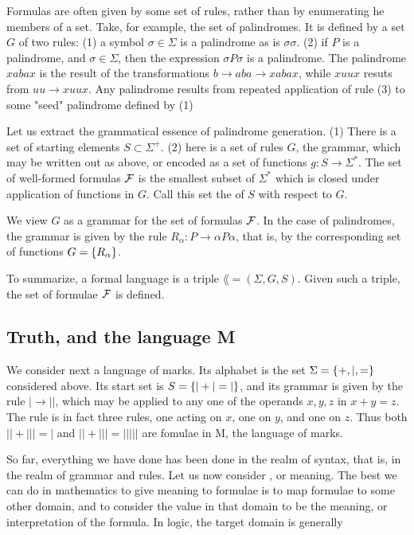 Formulas  are often given by some set of rules, rather than by enumerating he members of a set.  Take, for example, the set of palindromes.  It is defined by a set $G$ of two rules: (1) a symbol $\sigma \in \Sigma$ is a palindrome as is $\sigma\sigma$. (2) if $P$ is a palindrome, and $\sigma \in \Sigma$, then the expression $\sigma P \sigma$ is a palindrome.  The palindrome $xabax$ is the result of the transformations $b \to aba \to xabax$, while $xuux$ resuts from $uu \to xuux$.  Any palindrome results from repeated application of rule (3) to some "seed" palindrome defined by (1)

Let us extract the grammatical essence of palindrome generation.  (1) There is a set of starting elements $S \subset \Sigma^+$.  (2) here is a set of rules $G$, the grammar, which may be written out as above, or encoded as a set of functions $g: S \to \Sigma^*$.  The set of well-formed formulas $\mathcal{F}$ is the smallest subset of $\Sigma^*$ which is closed under application of functions in $G$.  Call this set the  of $S$ with respect to $G$.

We view $G$ as a grammar for the set of formulas $\mathcal{F}$.  In the case of palindromes, the grammar is given by the rule $R_\alpha: P \to \alpha P \alpha$, that is, by the corresponding set of functions $G = \{  R_{\alpha } \}$.

To summarize, a formal language is a triple $\lang = (\Sigma, G, S)$.  Given such a triple, the set of formulae $\mathcal{F}$ is defined.

\subsection{Truth, and the language M}

We consider next a language of marks.  Its alphabet is the set $\Sigma = \{ +, |, = \}$ considered above.  Its start set is $S = \{  | + | = | \}$, and its grammar is given by the rule $| \to ||$, which may be applied to any one of the operands $x, y, z$ in $x + y = z$. The rule is in fact three rules, one acting on $x$, one on $y$, and one on $z$.  Thus both $|| + ||| = |$
and $|| + ||| = |||||$ are fomulae in M, the language of marks.

So far, everything we have done has been done in the realm of syntax, that is, in the realm of grammar and rules.  Let us now consider , or meaning.  The best we can do in mathematics to give meaning to formulae is to map formulae to some other domain, and to consider the value in that domain to be the meaning, or interpretation of the formula.  In logic, the target domain is generally

